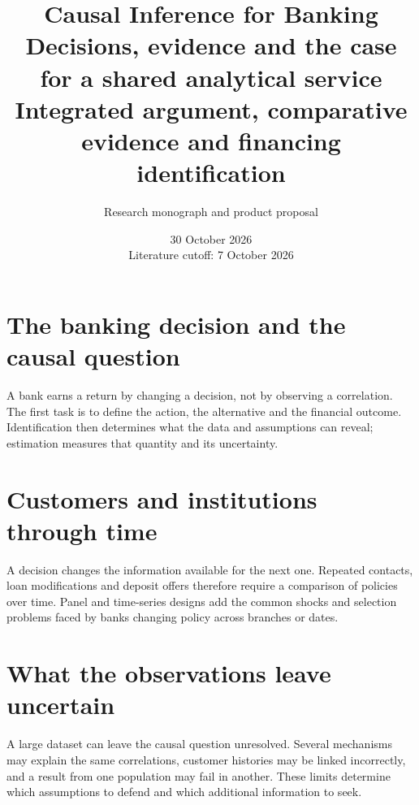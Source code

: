 \documentclass[11pt,a4paper,openany]{book}
\title{\sffamily\bfseries\color{ink}Causal Inference for Banking\\[14pt]
\Large Decisions, evidence and the case for a shared analytical service\\[8pt]\large Integrated argument, comparative evidence and financing identification}
\author{Research monograph and product proposal}
\date{30 October 2026\\Literature cutoff: 7 October 2026}
\begin{document}
\frontmatter
\maketitle

\begingroup\setlength{\parskip}{0pt}\tableofcontents\endgroup
\mainmatter
\part{The banking decision and the causal question}
\label{reading:part-decision}
A bank earns a return by changing a decision, not by observing a correlation.
The first task is to define the action, the alternative and the financial outcome.
Identification then determines what the data and assumptions can reveal;
estimation measures that quantity and its uncertainty.







\part{Customers and institutions through time}
\label{reading:part-time}
A decision changes the information available for the next one. Repeated
contacts, loan modifications and deposit offers therefore require a comparison
of policies over time. Panel and time-series designs add the common shocks
and selection problems faced by banks changing policy across branches or dates.











\part{What the observations leave uncertain}
\label{reading:part-uncertainty}
A large dataset can leave the causal question unresolved. Several mechanisms
may explain the same correlations, customer histories may be linked incorrectly,
and a result from one population may fail in another. These limits determine
which assumptions to defend and which additional information to seek.
\end{document}
